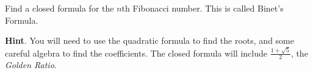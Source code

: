 \documentclass{book}
\begin{document}
\setcounter{cpjt}{150}
\addtocounter{cpjt}{-1}
\begin{activity}\label{act-binet}
\hypertarget{p-955}{}%
Find a closed formula for the \(n\)th Fibonacci number.  This is called Binet's Formula.%
\par\smallskip%
\noindent\textbf{Hint}.\hypertarget{hint-109}{}\quad%
\hypertarget{p-956}{}%
You will need to use the quadratic formula to find the roots, and some careful algebra to find the coefficients.  The closed formula will include \(\frac{1+\sqrt{5}}{2}\), the \emph{Golden Ratio}.%
\end{activity}

\clearpage
\end{document}
